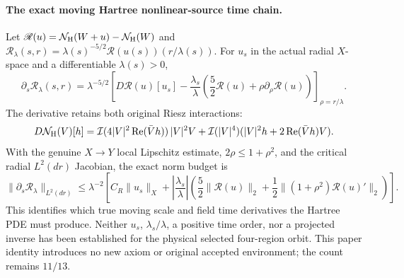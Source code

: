 \documentclass[11pt]{amsart}
\begin{document}
\paragraph{The exact moving Hartree nonlinear-source time chain.}
Let \(\mathscr R(u)=\mathcal N_{\rm H}(W+u)
-\mathcal N_{\rm H}(W)\) and
\(\mathscr R_\lambda(s,r)
=\lambda(s)^{-5/2}\mathscr R(u(s))(r/\lambda(s))\).
For \(u_s\) in the actual radial \(X\)-space and
a differentiable \(\lambda(s)>0\),
\[
 \partial_s\mathscr R_\lambda(s,r)
 =\lambda^{-5/2}
 \left[
 D\mathscr R(u)[u_s]
 -\frac{\lambda_s}{\lambda}
 \left(\frac52\mathscr R(u)+
       \rho\partial_\rho\mathscr R(u)\right)
 \right]_{\rho=r/\lambda}.
\]
The derivative retains both original Riesz interactions:
\[
 D\mathcal N_{\rm H}(V)[h]
 =\mathcal I(4|V|^2\operatorname{Re}(\bar Vh))\,|V|^2V
 +\mathcal I(|V|^4)
  (|V|^2h+2\operatorname{Re}(\bar Vh)V).
\]
With the genuine \(X\to Y\) local Lipschitz
estimate, \(2\rho\le1+\rho^2\), and the
critical radial \(L^2(dr)\) Jacobian, the exact
norm budget is
\[
 \|\partial_s\mathscr R_\lambda\|_{L^2(dr)}
 \le\lambda^{-2}\left[
 C_R\|u_s\|_X+
 \left|\frac{\lambda_s}{\lambda}\right|
 \left(\frac52\|\mathscr R(u)\|_2+
       \frac12\|(1+\rho^2)\mathscr R(u)'\|_2\right)
 \right].
\]
This identifies which true moving scale and
field time derivatives the Hartree PDE must
produce. Neither \(u_s\), \(\lambda_s/\lambda\),
a positive time order, nor a projected inverse
has been established for the physical selected
four-region orbit. This paper identity introduces
no new axiom or original accepted environment;
the count remains \(11/13\).
\end{document}
